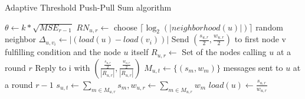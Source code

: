 \begin{algorithm}
    \caption{Adaptive Threshold Push-Pull Sum algorithm}\label{alg:PPS}
    \begin{algorithmic}[1]
    \State $\theta \leftarrow k * \sqrt{MSE_{r-1}}$ 
    \EndProcedure
    \State $RN_{u,r} \leftarrow$ choose $\lceil \log_{2}{(|neighborhood(u)|)} \rceil$ random neighbor
    \State $\Delta_{u, v_{i}} \leftarrow |(load(u) - load(v_{i}))|$
    \State Send $(\frac{s_{u,r}}{2}, \frac{w_{u,r}}{2})$ to first node v fulfilling condition and the node $u$ itself
    \EndIf
    \EndFor
    \EndProcedure
    \State $R_{u,r} \leftarrow$ Set of the nodes calling $u$ at a round $r$
    \State Reply to i with $\left( \frac{\frac{s_{u,r}}{2}}{|R_{u,r}|}, \frac{\frac{w_{u,r}}{2}}{|R_{u,r}|} \right)$
    \EndFor
    \EndProcedure
    \State $M_{u,t} \leftarrow \{(s_{m}, w_{m})\}$ messages sent to $u$ at a round $r-1$
    \State $s_{u,t} \leftarrow \sum_{m \in M_{u,r}}^{}s_{m}, w_{u,r} \leftarrow\sum_{m \in M_{u,r}}^{}w_{m}$
    \State $load(u) \leftarrow \frac{s_{u,r}}{w_{u,r}}$
    \EndProcedure
    \end{algorithmic}
    \end{algorithm}